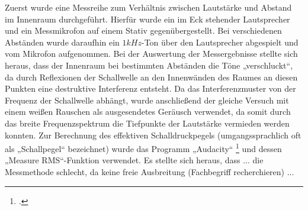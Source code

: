 Zuerst wurde eine Messreihe zum Verhältnis zwischen Lautstärke und Abstand im Innenraum durchgeführt. Hierfür wurde ein im Eck stehender Lautsprecher und ein Messmikrofon auf einem Stativ gegenübergestellt. Bei verschiedenen Abständen wurde daraufhin ein \(1 kHz\)-Ton über den Lautsprecher abgespielt und vom Mikrofon aufgenommen. Bei der Auswertung der Messergebnisse stellte sich heraus, dass der Innenraum bei bestimmten Abständen die Töne „verschluckt“, da durch Reflexionen der Schallwelle an den Innenwänden des Raumes an diesen Punkten eine destruktive Interferenz entsteht. Da das Interferenzmuster von der Frequenz der Schallwelle abhängt, wurde anschließend der gleiche Versuch mit einem weißen Rauschen als ausgesendetes Geräusch verwendet, da somit durch das breite Frequenzspektrum die Tiefpunkte der Lautstärke vermieden werden konnten. Zur Berechnung des effektiven Schalldruckpegels (umgangssprachlich oft als „Schallpegel“ bezeichnet) wurde das Programm „Audacity“ \footcite{Audacity} und dessen „Measure RMS“-Funktion verwendet.
Es stellte sich heraus, dass ... die Messmethode schlecht, da keine freie Ausbreitung (Fachbegriff recherchieren) ...